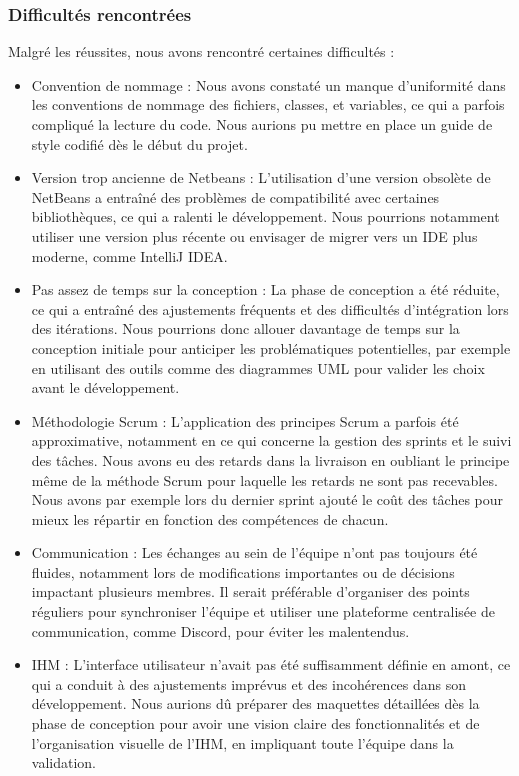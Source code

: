 \documentclass[a4paper]{article}
\begin{document}
\subsubsection{Difficultés rencontrées}
Malgré les réussites, nous avons rencontré certaines difficultés :
\begin{itemize}
    \item Convention de nommage : Nous avons constaté un manque d’uniformité dans les conventions de nommage des fichiers, classes, et variables, ce qui a parfois compliqué la lecture du code. Nous aurions pu mettre en place un guide de style codifié dès le début du projet.
    \item Version trop ancienne de Netbeans : L’utilisation d’une version obsolète de NetBeans a entraîné des problèmes de compatibilité avec certaines bibliothèques, ce qui a ralenti le développement. Nous pourrions notamment utiliser une version plus récente ou envisager de migrer vers un IDE plus moderne, comme IntelliJ IDEA.
    \item Pas assez de temps sur la conception : La phase de conception a été réduite, ce qui a entraîné des ajustements fréquents et des difficultés d’intégration lors des itérations. Nous pourrions donc allouer davantage de temps sur la conception initiale pour anticiper les problématiques potentielles, par exemple en utilisant des outils comme des diagrammes UML pour valider les choix avant le développement.
    \item Méthodologie Scrum : L’application des principes Scrum a parfois été approximative, notamment en ce qui concerne la gestion des sprints et le suivi des tâches. Nous avons eu des retards dans la livraison en oubliant le principe même de la méthode Scrum pour laquelle les retards ne sont pas recevables. Nous avons par exemple lors du dernier sprint ajouté le coût des tâches pour mieux les répartir en fonction des compétences de chacun.
    \item Communication : Les échanges au sein de l’équipe n’ont pas toujours été fluides, notamment lors de modifications importantes ou de décisions impactant plusieurs membres. Il serait préférable d'organiser des points réguliers pour synchroniser l’équipe et utiliser une plateforme centralisée de communication, comme Discord, pour éviter les malentendus.
    \item IHM : L'interface utilisateur n'avait pas été suffisamment définie en amont, ce qui a conduit à des ajustements imprévus et des incohérences dans son développement. Nous aurions dû préparer des maquettes détaillées dès la phase de conception pour avoir une vision claire des fonctionnalités et de l'organisation visuelle de l'IHM, en impliquant toute l'équipe dans la validation.
\end{itemize}
\end{document}
